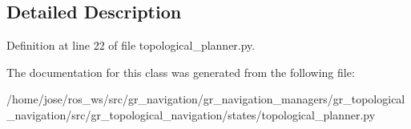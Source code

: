 \subsection{Detailed Description}


Definition at line 22 of file topological\+\_\+planner.\+py.



The documentation for this class was generated from the following file\+:\begin{DoxyCompactItemize}
\item 
/home/jose/ros\+\_\+ws/src/gr\+\_\+navigation/gr\+\_\+navigation\+\_\+managers/gr\+\_\+topological\+\_\+navigation/src/gr\+\_\+topological\+\_\+navigation/states/topological\+\_\+planner.\+py\end{DoxyCompactItemize}
